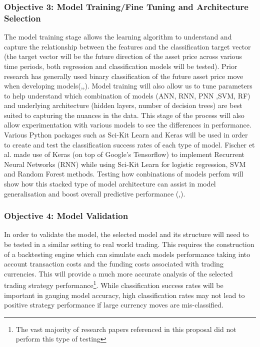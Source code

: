 \documentclass[11pt]{article}
\begin{document}
\subsubsection{Objective 3: Model Training/Fine Tuning and Architecture Selection}
The model training stage allows the learning algorithm to understand and capture the relationship between the features and the classification target vector (the target vector will be the future direction of the asset price across various time periods, both regression and classification models will be tested). Prior research has generally used binary classification of the future asset price move when developing models(\cite{Abreu2018},\cite{Gunduz2017},\cite{Chatzis2018}). \newline Model training will also allow us to tune parameters to help understand which combination of models (ANN, RNN, PNN ,SVM, RF) and underlying architecture (hidden layers, number of decision trees) are best suited to capturing the nuances in the data. This stage of the process will also allow experimentation with various  models to see the differences in performance. Various Python packages such as Sci-Kit Learn and Keras will be used in order to create and test the classification success rates of each type of model. Fischer et al. made use of Keras (on top of Google's Tensorflow) to implement Recurrent Neural Networks (RNN) \cite{Fischer2018} while using Sci-Kit Learn for logistic regression, SVM and Random Forest methods. \newline Testing how conbinations of models perfom will show how this stacked type of model architecture can assist in model generalisation and boost overall predictive performance (\cite{Chatzis2018},\cite{Stock2010}).


 
\subsubsection{Objective 4: Model Validation}
In order to validate the model, the selected model and its structure will need to be tested in a similar setting to real world trading. This requires the construction of a backtesting engine which can simulate each models performance taking into account transaction costs and the funding costs associated with trading currencies.
This will provide a much more accurate analysis of the selected trading strategy performance\footnote{The vast majority of research papers referenced in this proposal did not perform this type of testing}. While classification success rates will be important in gauging model accuracy, high classification rates may not lead to positive strategy performance if large currency moves are mis-classified.
\end{document}
